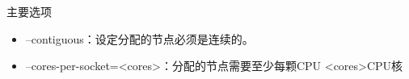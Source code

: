 \begin{frame}{主要选项}
\begin{itemize}
     \item --contiguous：设定分配的节点必须是连续的。
     \item --cores-per-socket=<cores>：分配的节点需要至少每颗CPU <cores>CPU核







\end{itemize}
\end{frame}
